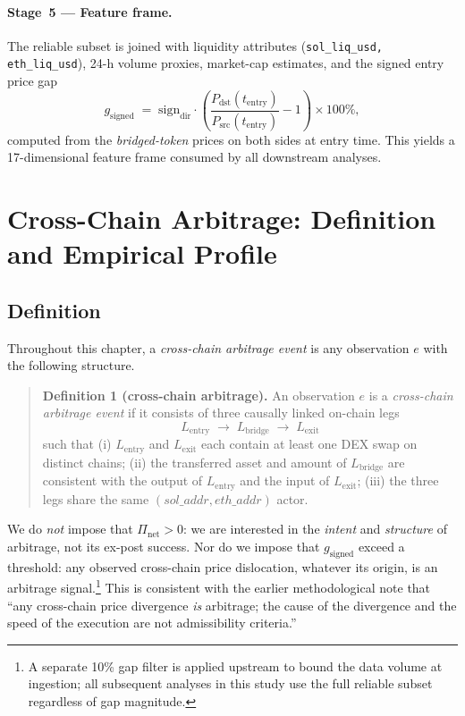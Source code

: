 \documentclass[11pt,a4paper]{article}
\newcommand{\gsigned}{g_{\text{signed}}}
\begin{document}
\paragraph{Stage~5 --- Feature frame.} The reliable subset is joined with
liquidity attributes (\texttt{sol\_liq\_usd, eth\_liq\_usd}), 24-h volume
proxies, market-cap estimates, and the signed entry price gap
\begin{equation}
\label{eq:ch4-gsigned}
    \gsigned \;=\; \mathrm{sign}_{\text{dir}}\cdot
    \left(\frac{P_{\text{dst}}(t_{\text{entry}})}{P_{\text{src}}(t_{\text{entry}})}-1\right)
    \times 100\%,
\end{equation}
computed from the \emph{bridged-token} prices on both sides at entry time.
This yields a 17-dimensional feature frame consumed by all downstream
analyses.

\section{Cross-Chain Arbitrage: Definition and Empirical Profile}
\label{sec:ch4-arbitrage}

\subsection{Definition}

Throughout this chapter, a \emph{cross-chain arbitrage event} is any
observation $e$ with the following structure.

\begin{quote}
\textbf{Definition 1 (cross-chain arbitrage).} An observation $e$ is a
\textit{cross-chain arbitrage event} if it consists of three causally
linked on-chain legs
\[
    L_{\text{entry}} \;\to\; L_{\text{bridge}} \;\to\; L_{\text{exit}}
\]
such that (i) $L_{\text{entry}}$ and $L_{\text{exit}}$ each contain at
least one DEX swap on distinct chains; (ii) the transferred asset and
amount of $L_{\text{bridge}}$ are consistent with the output of
$L_{\text{entry}}$ and the input of $L_{\text{exit}}$; (iii) the three legs
share the same $(sol\_addr, eth\_addr)$ actor.
\end{quote}

We do \emph{not} impose that $\Pi_{\text{net}} > 0$: we are interested in
the \emph{intent} and \emph{structure} of arbitrage, not its ex-post
success. Nor do we impose that $\gsigned$ exceed a threshold: any observed
cross-chain price dislocation, whatever its origin, is an arbitrage
signal.\footnote{A separate 10\% gap filter is applied upstream to bound
the data volume at ingestion; all subsequent analyses in this study use the
full reliable subset regardless of gap magnitude.} This is consistent with
the earlier methodological note that ``any cross-chain price divergence
\emph{is} arbitrage; the cause of the divergence and the speed of the
execution are not admissibility criteria.''
\end{document}
